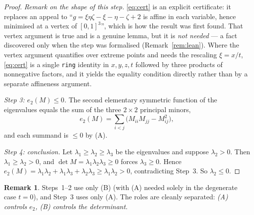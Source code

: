 \documentclass[11pt]{article}
\theoremstyle{plain}
\theoremstyle{definition}
\newtheorem{remark}[theorem]{Remark}
\begin{document}
\begin{proof}
\emph{Remark on the shape of this step.} \eqref{eq:cert} is an explicit certificate: it replaces an
appeal to ``$g=\xi\eta\zeta-\xi-\eta-\zeta+2$ is affine in each variable, hence minimised at a
vertex of $[0,1]^3$'', which is how the result was first found. That vertex argument is true and is
a genuine lemma, but it is \emph{not needed} --- a fact discovered only when the step was formalised
(Remark~\ref{rem:lean}). Where the vertex argument quantifies over extreme points and needs the
rescaling $\xi=x/t$, \eqref{eq:cert} is a single \texttt{ring} identity in $x,y,z,t$ followed by
three products of nonnegative factors, and it yields the equality condition directly rather than by
a separate affineness argument.

\emph{Step 3: $e_2(M)\le0$.} The second elementary symmetric function of the eigenvalues equals the
sum of the three $2\times2$ principal minors,
\[
e_2(M)=\sum_{i<j}\big(M_{ii}M_{jj}-M_{ij}^2\big),
\]
and each summand is $\le0$ by (A).

\emph{Step 4: conclusion.} Let $\lambda_1\ge\lambda_2\ge\lambda_3$ be the eigenvalues and suppose
$\lambda_2>0$. Then $\lambda_1\ge\lambda_2>0$, and $\det M=\lambda_1\lambda_2\lambda_3\ge0$ forces
$\lambda_3\ge0$. Hence $e_2(M)=\lambda_1\lambda_2+\lambda_1\lambda_3+\lambda_2\lambda_3
\ge\lambda_1\lambda_2>0$, contradicting Step~3. So $\lambda_2\le0$.
\end{proof}

\begin{remark}
Steps~1--2 use only (B) (with (A) needed solely in the degenerate case $t=0$), and Step~3 uses only
(A). The roles are cleanly separated: \emph{(A) controls $e_2$, (B) controls the determinant.}
\end{remark}
\end{document}
